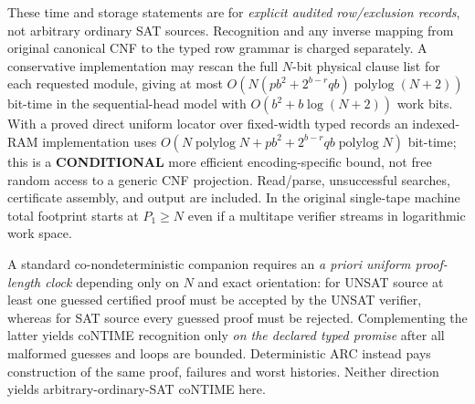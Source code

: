 \documentclass[11pt]{article}
\begin{document}
These time and storage statements are for \emph{explicit audited row/exclusion records}, not arbitrary ordinary SAT sources. Recognition and any inverse mapping from original canonical CNF to the typed row grammar is charged separately. A conservative implementation may rescan the full $N$-bit physical clause list for each requested module, giving at most $O(N(pb^2+2^{b-r}qb)\operatorname{polylog}(N+2))$ bit-time in the sequential-head model with $O(b^2+b\log(N+2))$ work bits. With a proved direct uniform locator over fixed-width typed records an indexed-RAM implementation uses $O(N\operatorname{polylog}N+pb^2+2^{b-r}qb\operatorname{polylog}N)$ bit-time; this is a \textbf{CONDITIONAL} more efficient encoding-specific bound, not free random access to a generic CNF projection. Read/parse, unsuccessful searches, certificate assembly, and output are included. In the original single-tape machine total footprint starts at $P_1\ge N$ even if a multitape verifier streams in logarithmic work space.

A standard co-nondeterministic companion requires an \emph{a priori uniform proof-length clock} depending only on $N$ and exact orientation: for UNSAT source at least one guessed certified proof must be accepted by the UNSAT verifier, whereas for SAT source every guessed proof must be rejected. Complementing the latter yields coNTIME recognition only \emph{on the declared typed promise} after all malformed guesses and loops are bounded. Deterministic ARC instead pays construction of the same proof, failures and worst histories. Neither direction yields arbitrary-ordinary-SAT coNTIME here.
\end{document}
